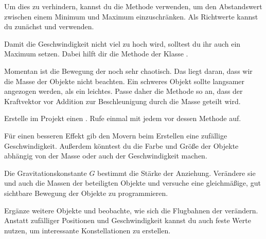 \documentclass[9pt, a4paper, ngerman]{arbeitsblatt}
\begin{document}
\begin{aufgabe}[subtitle=Flug der Atome,icon=\iconComputer]
\begin{enuma}[start=3]
\begin{smallitem}
		Um dies zu verhindern, kannst du die  Methode verwenden, um den Abstandswert zwischen einem Minimum und Maximum einzuschränken. Als Richtwerte kannst du zunächst  und  verwenden.
		\item Damit die Geschwindigkeit nicht viel zu hoch wird, solltest du ihr auch ein Maximum setzen. Dabei hilft dir die  Methode der Klasse .
	\end{smallitem}
	\item Momentan ist die Bewegung der  noch sehr chaotisch. Das liegt daran, dass wir die Masse der Objekte nicht beachten. Ein schweres Objekt sollte langsamer angezogen werden, als ein leichtes. Passe daher die Methode  so an, dass der Kraftvektor vor Addition zur Beschleunigung durch die Masse geteilt wird.
	\item Erstelle im Projekt einen . Rufe  einmal mit jedem  vor dessen  Methode auf.

	Für einen besseren Effekt gib den Movern beim Erstellen eine zufällige Geschwindigkeit. Außerdem könntest du die Farbe und Größe der Objekte abhängig von der Masse oder auch der Geschwindigkeit machen.
	\item Die Gravitationskonstante $G$ bestimmt die Stärke der Anziehung. Verändere sie und auch die Massen der beteiligten Objekte und versuche eine gleichmäßige, gut sichtbare Bewegung der Objekte zu programmieren.

	Ergänze weitere  Objekte und beobachte, wie sich die Flugbahnen der  verändern. Anstatt zufälliger Positionen und Geschwindigkeit kannst du auch feste Werte nutzen, um interessante Konstellationen zu erstellen.
\end{enuma}
\end{aufgabe}
\end{document}
